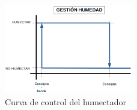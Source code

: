    \vspace*{\fill}

\begin{figure}[H]
    \centering
    \includegraphics[width=0.5\textwidth, keepaspectratio]{img/3-gestionHumedad}
    \caption{Curva de control del humectador}
    \label{figura:gestionHumectador}
\end{figure}

   \vspace*{\fill}


